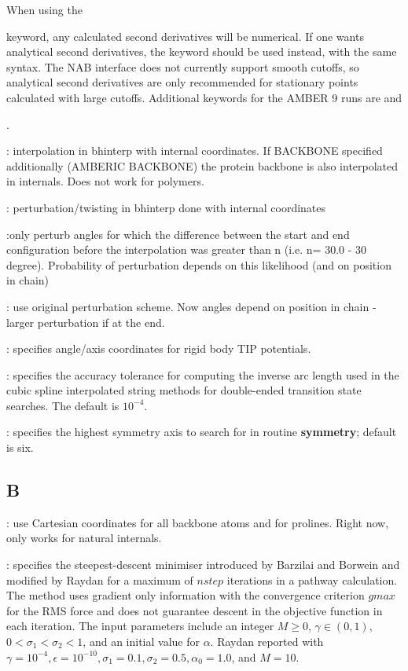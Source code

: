 When using the { keyword, any calculated second derivatives will be 
numerical. If one wants analytical second derivatives, the {} keyword 
should be used instead, with the same syntax. The NAB interface does not 
currently support smooth cutoffs, so analytical second derivatives are only 
recommended for stationary points calculated with large cutoffs.
Additional keywords for the AMBER 9 runs are {} and {.

: interpolation in bhinterp with internal coordinates. If BACKBONE specified additionally (AMBERIC BACKBONE) the protein backbone is also interpolated in internals. Does not work for polymers.

: perturbation/twisting in bhinterp done with internal coordinates

:only perturb angles for which the difference between the start and end configuration before the interpolation was greater than n (i.e. n= 30.0 - 30 degree). Probability of perturbation depends on this likelihood (and on position in chain)

: use original perturbation scheme. Now angles depend on position in chain - larger perturbation if at the end.

: specifies angle/axis coordinates for rigid body TIP potentials.

: specifies the accuracy tolerance for computing the
  inverse arc length used in the cubic spline interpolated string methods for
  double-ended transition state searches. The default is $10^{-4}$.

: specifies the highest symmetry axis to search for in
routine {\bf symmetry}; default is six.



\subsection{B}
: use Cartesian coordinates for all backbone atoms and for
  prolines. Right now, only works for natural internals.

: specifies
the steepest-descent minimiser introduced by Barzilai and Borwein \cite{BB-IMAJNA-1988}
and modified by Raydan \cite{Raydan-SIAMJO-1997} for a maximum of $nstep$ iterations
in a pathway calculation. The method uses 
gradient only information with the convergence criterion $gmax$ for the RMS force
and does not guarantee descent in the objective function in each iteration.
The input parameters include an integer $M \ge 0$, $\gamma \in (0,1)$, 
$0 < \sigma_{1} < \sigma_{2} < 1$, and an initial value for $\alpha$. Raydan reported
with $\gamma = 10^{-4}, \epsilon = 10^{-10},
\sigma_{1} = 0.1, \sigma_{2} = 0.5, \alpha_{0} = 1.0$, and $M = 10$.   

}}
